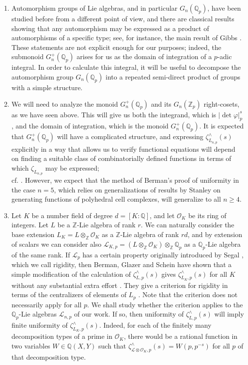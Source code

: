 \documentclass[12pt]{article}
\begin{document}
\begin{enumerate}
    \item 
Automorphism groups of Lie algebras, and in particular $G_{n}(\mathbb{Q}_{p})$, have been studied before from a different point of view, and there are classical results showing that any automorphism may be expressed as a product of automorphisms of a specific type; see, for instance, the main result of Gibbs \cite{Gibbs}.  These statements are not explicit enough for our purposes; indeed, the submonoid $G_{n}^{+}(\mathbb{Q}_p)$ arises for us as the domain of integration of a $p$-adic integral. In order to calculate this integral, it will be useful to decompose the automorphism group $G_{n}(\mathbb{Q}_p)$ into a repeated semi-direct product of groups with a simple structure.
\item 
We will need to analyze the monoid $G_{n}^{+}(\mathbb{Q}_p)$ and its $G_{n}(\mathbb{Z}_p)$ right-cosets, as we have seen above. This will give us both the integrand, which is $|\det\varphi|_{p}^{s}$, and the domain of integration, which is the monoid $G_{n}^{+}(\mathbb{Q}_p)$. It is expected that $G_{n}^{+}(\mathbb{Q}_{p})$ will have a complicated structure, and expressing $\zeta_{L_{n,p}}^{\wedge}(s)$ explicitly in a way that allows us to verify functional equations will depend on finding a suitable class of combinatorially defined functions in terms of which $\zeta_{L_{n,p}}$ may be expressed;\\ cf. \cite[Theorem 4.21]{CarnevaleScheinVoll}. However, we expect that the method of Berman's proof of uniformity in the case $n=5$, which relies on generalizations of results by Stanley on generating functions of polyhedral cell complexes, will generalize to all $n\geq{4}$.
\item 
Let $K$ be a number field of degree $d=[K:\mathbb{Q}]$, and let $\mathcal{O}_K$ be its ring of integers. Let $L$ be a $\mathbb{Z}$-Lie algebra of rank $r$. We can naturally consider the base extension $L_{K}=L\otimes_{\mathbb{Z}}\mathcal{O}_{K}$ as a $\mathbb{Z}$-Lie algebra of rank $rd$, and by extension of scalars we can consider also $\mathcal{L}_{K,p}=(L\otimes_{\mathbb{Z}}\mathcal{O}_K)\otimes_{\mathbb{Z}}\mathbb{Q}_p$ as a $\mathbb{Q}_p$-Lie algebra of the same rank. If $\mathcal{L}_{p}$ has a certain property originally introduced by Segal \cite{Segal}, which we call rigidity, then Berman, Glazer and Schein have shown that a simple modification of the calculation of $\zeta_{L,p}^{\wedge}(s)$ gives $\zeta_{L_{K},p}^{\wedge}(s)$ for all $K$ without any substantial extra effort \cite[Proposition 3.14]{BermanGlazerSchein}. They give a criterion for rigidity in terms of the centralizers of elements of $L_{p}$ \cite[Theorem 3.9]{BermanGlazerSchein}. Note that the criterion does not necessarily apply for all $p$. We shall study whether the criterion applies to the $\mathbb{Q}_p$-Lie algebras $\mathcal{L}_{n,p}$ of our work. If so, then uniformity of $\zeta_{L,p}^{\wedge}(s)$ will imply finite uniformity of $\zeta_{L_{K},p}^{\wedge}(s)$. Indeed, for each of the finitely many decomposition types of a prime in $\mathcal{O}_K$, there would be a rational function in two variables $W\in\mathbb{Q}(X,Y)$ such that $\zeta_{\mathcal{L}\otimes\mathcal{O}_K,p}^{\wedge}(s)=W(p,p^{-s})$ for all $p$ of that decomposition type.
\end{enumerate}
\end{document}
